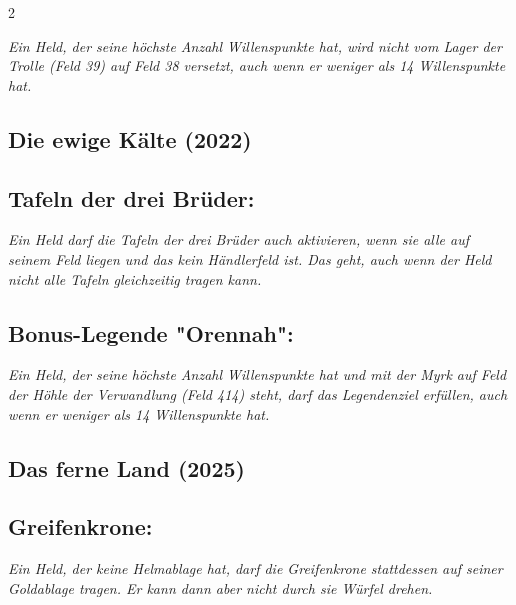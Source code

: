 \documentclass[10pt, a4paper, oneside]{book}
\newcommand{\fan}[1]{\textit{#1}}
\begin{document}
\begin{multicols*}{2}
\begin{bgcolor}[color-dz]
\fan{Ein Held, der seine höchste Anzahl Willenspunkte hat, wird nicht vom Lager der Trolle (Feld 39) auf Feld 38 versetzt, auch wenn er weniger als 14 Willenspunkte hat.}

\end{bgcolor}



\begin{bgcolor}
\section{Die ewige Kälte (2022)}


\subsection{Tafeln der drei Brüder:}

\fan{Ein Held darf die Tafeln der drei Brüder auch aktivieren, wenn sie alle auf seinem Feld liegen und das kein Händlerfeld ist. Das geht, auch wenn der Held nicht alle Tafeln gleichzeitig tragen kann.}


\subsection{Bonus-Legende "Orennah":}

\fan{Ein Held, der seine höchste Anzahl Willenspunkte hat und mit der Myrk auf Feld der Höhle der Verwandlung (Feld 414) steht, darf das Legendenziel erfüllen, auch wenn er weniger als 14 Willenspunkte hat.}

\end{bgcolor}


\begin{bgcolor}
\section{Das ferne Land (2025)}



\subsection{Greifenkrone:}

\fan{Ein Held, der keine Helmablage hat, darf die Greifenkrone stattdessen auf seiner Goldablage tragen. Er kann dann aber nicht durch sie Würfel drehen.}

\end{bgcolor}



\end{multicols*}
\end{document}
